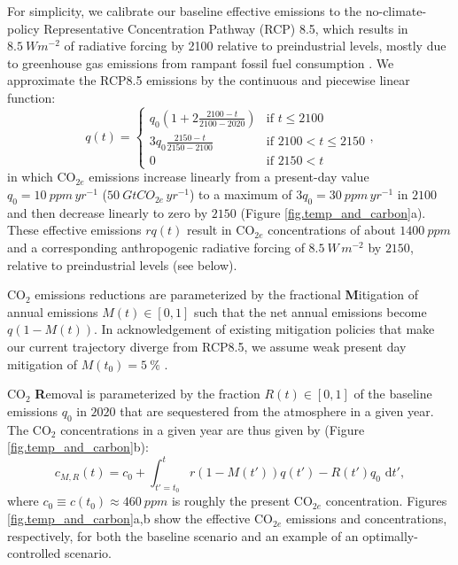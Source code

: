 \documentclass{article}
\begin{document}
For simplicity, we calibrate our baseline effective emissions to the no-climate-policy Representative Concentration Pathway (RCP) 8.5, which results in $\SI{8.5}{W m^{-2}}$ of radiative forcing by 2100 relative to preindustrial levels, mostly due to greenhouse gas emissions from rampant fossil fuel consumption \citep{riahi_scenarios_2007}. We approximate the RCP8.5 emissions by the continuous and piecewise linear function:
\begin{equation}
    q(t) = 
    \begin{cases}
        q_{0}(1 + 2\frac{2100-t}{2100-2020}) &\mbox{if } t \le 2100 \\
        3q_{0}\frac{2150-t}{2150-2100} &\mbox{if } 2100 < t \le 2150 \\
        0 &\mbox{if } 2150 < t
    \end{cases},\label{eq.baseline_emissions}
\end{equation}
in which CO$_{2e}$ emissions increase linearly from a present-day value $q_{0} = \SI{10}{ppm\, yr^{-1}}$ ($\SI{50}{GtCO_{2e}\, yr^{-1}}$) to a maximum of $3q_{0} = \SI{30}{ppm\, yr^{-1}}$ in $2100$ and then decrease linearly to zero by $2150$ (Figure \ref{fig.temp_and_carbon}a). These effective emissions $rq(t)$ result in CO$_{2e}$ concentrations of about $\SI{1400}{ppm}$ and a corresponding anthropogenic radiative forcing of $\SI{8.5}{W\, m^{-2}}$ by $2150$, relative to preindustrial levels (see below).

CO$_{2}$ emissions reductions are parameterized by the fractional \textbf{M}itigation of annual emissions $M(t) \in [0,1]$ such that the net annual emissions become $q(1-M(t))$. In acknowledgement of existing mitigation policies that make our current trajectory diverge from RCP8.5, we assume weak present day mitigation of $M(t_{0}) = \SI{5}{\%}$ \citep{hausfather_emissions_2020}.

CO$_{2}$ \textbf{R}emoval is parameterized by the fraction $R(t) \in [0,1]$ of the baseline emissions $q_{0}$ in $2020$ that are sequestered from the atmosphere in a given year. The CO$_{2}$ concentrations in a given year are thus given by (Figure \ref{fig.temp_and_carbon}b):
\begin{equation}
    c_{M, R}(t) = c_{0} + \int_{t'=t_{0}}^{t} r(1-M(t'))q(t') - R(t')q_{0} \text{ d}t'\label{eq-CO2-conc},
\end{equation}
where $c_{0} \equiv c(t_{0}) \approx \SI{460}{ppm}$ is roughly the present CO$_{2e}$ concentration. Figures \ref{fig.temp_and_carbon}a,b show the effective CO$_{2e}$ emissions and concentrations, respectively, for both the baseline scenario and an example of an optimally-controlled scenario.
\end{document}
